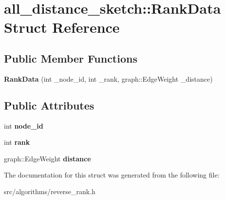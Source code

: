 \hypertarget{structall__distance__sketch_1_1RankData}{}\section{all\+\_\+distance\+\_\+sketch\+:\+:Rank\+Data Struct Reference}
\label{structall__distance__sketch_1_1RankData}
\subsection*{Public Member Functions}
\begin{DoxyCompactItemize}
\item 
\hypertarget{structall__distance__sketch_1_1RankData_a984a2fad72c1f2e3d7cd7872d77f663b}{}{\bfseries Rank\+Data} (int \+\_\+node\+\_\+id, int \+\_\+rank, graph\+::\+Edge\+Weight \+\_\+distance)\label{structall__distance__sketch_1_1RankData_a984a2fad72c1f2e3d7cd7872d77f663b}

\end{DoxyCompactItemize}
\subsection*{Public Attributes}
\begin{DoxyCompactItemize}
\item 
\hypertarget{structall__distance__sketch_1_1RankData_a810f00716cd239a5dbbc8954444ac260}{}int {\bfseries node\+\_\+id}\label{structall__distance__sketch_1_1RankData_a810f00716cd239a5dbbc8954444ac260}

\item 
\hypertarget{structall__distance__sketch_1_1RankData_a857ea4a909d1b4ccb47b74713036f061}{}int {\bfseries rank}\label{structall__distance__sketch_1_1RankData_a857ea4a909d1b4ccb47b74713036f061}

\item 
\hypertarget{structall__distance__sketch_1_1RankData_ae44a3a624b7346a2758a762b5ae557d1}{}graph\+::\+Edge\+Weight {\bfseries distance}\label{structall__distance__sketch_1_1RankData_ae44a3a624b7346a2758a762b5ae557d1}

\end{DoxyCompactItemize}


The documentation for this struct was generated from the following file\+:\begin{DoxyCompactItemize}
\item 
src/algorithms/reverse\+\_\+rank.\+h\end{DoxyCompactItemize}
